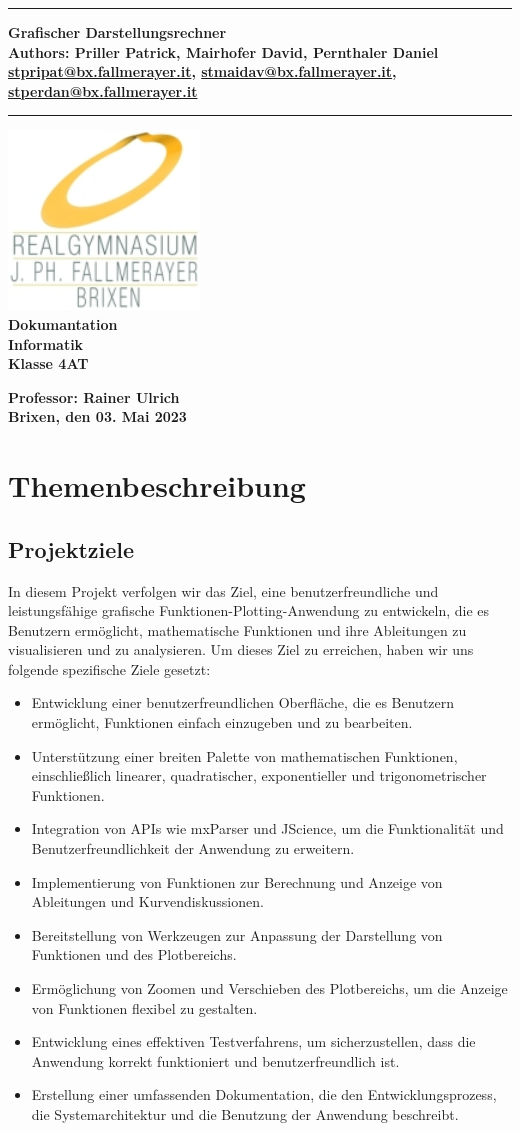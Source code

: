 \documentclass[a4paper]{article}
\newcommand{\CustomTitle}[9]{
    \thispagestyle{empty}
    \vspace*{\stretch{1}}
    {\parindent0cm \rule{\linewidth}{.7ex}}
    \begin{flushright}
        \vspace*{\stretch{1}}
        \sffamily\bfseries\huge
        #1\\
        \vspace*{\stretch{1}}
        \sffamily\bfseries\small
        #2\\
        \vspace*{\stretch{1}}
        \sffamily\bfseries\small
        #3
    \end{flushright}
    \rule{\linewidth}{.7ex}

    \vspace*{\stretch{1}}
    \begin{center}
        \includegraphics[width=2in]{Resources/Logo.png} \\
        \vspace*{\stretch{1}}
        \textbf{\Large Dokumantation}\\

        \vspace*{\stretch{2}}
        \textbf{\large Informatik}\\
        \textbf{\large Klasse 4AT}

        \vspace*{\stretch{1}}
        \textbf{\large Professor: Rainer Ulrich}  \\[1mm]

        \vspace*{\stretch{1}}
        \textbf{\large Brixen, den 03. Mai 2023}\\
        \vspace*{\stretch{0.25}}
    \end{center}
}
\begin{document}
\CustomTitle
{Grafischer Darstellungsrechner}
{Authors: Priller Patrick, Mairhofer David, Pernthaler Daniel}
{\href{mailto:stpripat@bx.fallmerayer.it}{stpripat@bx.fallmerayer.it}, \href{mailto:stmaidav@bx.fallmerayer.it}{stmaidav@bx.fallmerayer.it}, \href{mailto:stperdan@bx.fallmayer.it}{stperdan@bx.fallmerayer.it}}

{Oberschulzentrum J. Ph. Fallmerayer}
{Brixen}
{\today}
{Rainer Ulrich}
{}

\clearpage

\lhead{}
\setcounter{page}{1}
\tableofcontents

\clearpage

\section{Themenbeschreibung}

\subsection{Projektziele}

In diesem Projekt verfolgen wir das Ziel, eine benutzerfreundliche und leistungsfähige grafische Funktionen-Plotting-Anwendung zu entwickeln, die es Benutzern ermöglicht, mathematische Funktionen und ihre Ableitungen zu visualisieren und zu analysieren. Um dieses Ziel zu erreichen, haben wir uns folgende spezifische Ziele gesetzt:

\begin{itemize}
	\item Entwicklung einer benutzerfreundlichen Oberfläche, die es Benutzern ermöglicht, Funktionen einfach einzugeben und zu bearbeiten.
	\item Unterstützung einer breiten Palette von mathematischen Funktionen, einschließlich linearer, quadratischer, exponentieller und trigonometrischer Funktionen.
	\item Integration von APIs wie mxParser und JScience, um die Funktionalität und Benutzerfreundlichkeit der Anwendung zu erweitern.
	\item Implementierung von Funktionen zur Berechnung und Anzeige von Ableitungen und Kurvendiskussionen.
	\item Bereitstellung von Werkzeugen zur Anpassung der Darstellung von Funktionen und des Plotbereichs.
	\item Ermöglichung von Zoomen und Verschieben des Plotbereichs, um die Anzeige von Funktionen flexibel zu gestalten.
	\item Entwicklung eines effektiven Testverfahrens, um sicherzustellen, dass die Anwendung korrekt funktioniert und benutzerfreundlich ist.
	\item Erstellung einer umfassenden Dokumentation, die den Entwicklungsprozess, die Systemarchitektur und die Benutzung der Anwendung beschreibt.
\end{itemize}
\end{document}
